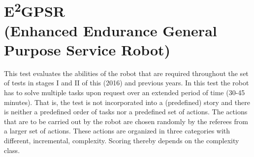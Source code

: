 %
%

\newcommand{\eegpsrTeams}{2~}
\newcommand{\eegpsrMaxCmd}{3~}
\newcommand{\eegpsrMaxCmdTime}{5~}
\newcommand{\eegpsrMaxTeamTime}{\eegpsrMaxCmd$\times$\eegpsrMaxCmdTime}

\section[EEGPSR]{E\textsuperscript{2}GPSR \\ \normalsize{(Enhanced Endurance General Purpose Service Robot)}}
\label{sec:eegpsr}

This test evaluates the abilities of the robot that are required throughout the set of tests in stages I and II of this (2016) and previous years. In this test the robot has to solve multiple tasks upon request over an extended period of time (30-45 minutes). That is, the test is not incorporated into a (predefined) story and there is neither a predefined order of tasks nor a predefined set of actions. The actions that are to be carried out by the robot are chosen randomly by the referees from a larger set of actions. These actions are organized in three categories with different, incremental, complexity. Scoring thereby depends on the complexity class.

